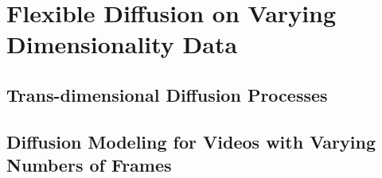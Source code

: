 \chapter{Flexible Diffusion on Varying Dimensionality Data}
\label{sec:tddm}

\section{Trans-dimensional Diffusion Processes}


\section{Diffusion Modeling for Videos with Varying Numbers of Frames}